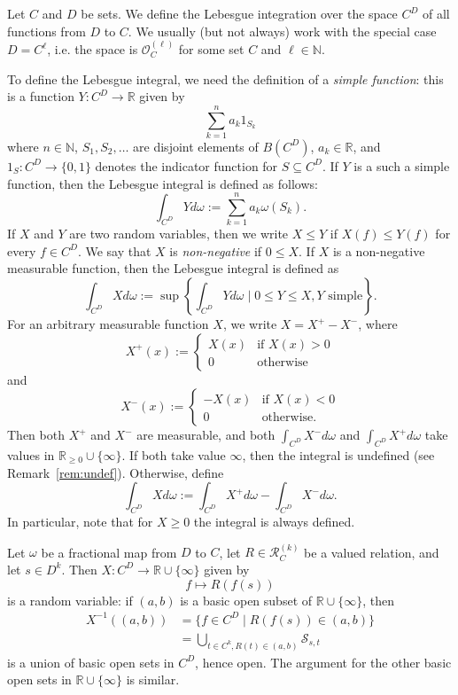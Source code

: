 \documentclass[nonacm]{acmart}
\newcommand{\N}{\mathbb N}
\begin{document}
Let $C$ and $D$ be sets. We define the Lebesgue integration over the space $C^D$ of all functions from $D$ to $C$. We usually (but not always) work with the special case $D = C^{\ell}$, i.e. the space is $\mathscr O_C^{(\ell)}$ for some set $C$ and $\ell\in \N$.

To define the Lebesgue integral, 
we need the definition of a \emph{simple function}:
this is a function $Y \colon C^D \to {\mathbb R}$ given by
$$\sum_{k=1}^n a_k 1_{S_k}$$
where $n \in \N$, $S_1,S_2,\dots$ are disjoint elements of $B(C^D)$, $a_k \in {\mathbb R}$, and $1_S \colon C^D \to \{0,1\}$ denotes the indicator function for $S \subseteq C^D$.
If $Y$ is a such a simple function, 
then the Lebesgue integral is defined as follows:
$$\int_{C^D} Y d \omega := \sum_{k =1}^n a_k \omega(S_k).$$
If $X$ and $Y$ are two random variables, then we write $X \leq Y$ if $X(f) \leq Y(f)$ for every $f \in C^D$. We say that $X$ is \emph{non-negative} if $0 \leq X$. 
If $X$ is a non-negative measurable function, then the Lebesgue integral is defined as 
$$\int_{C^D} X d \omega := \sup \left\{ \int_{C^D} Y d \omega \mid 0 \leq Y \leq X, Y \text{ simple} \right\}.$$
For an arbitrary measurable function $X$, we write $X = X^+ - X^-$, 
where $$X^+(x) := \begin{cases} X(x) & \text{if } X(x) > 0 \\
0 & \text{otherwise} \end{cases}$$
and 
$$X^-(x) := \begin{cases} -X(x) & \text{if } X(x) < 0 \\
0 & \text{otherwise.} \end{cases}$$
Then both $X^+$ and $X^-$ are measurable, and both 
$\int_{C^D} X^- d \omega$ 
and 
$\int_{C^D} X^+ d \omega$ take values in ${\mathbb R}_{\geq 0} \cup \{\infty\}$. 
If both take value $\infty$, then the integral is undefined (see Remark~\ref{rem:undef}). 
Otherwise, define 
$$\int_{C^D} X d \omega := \int_{C^D} X^+ d \omega - \int_{C^D} X^- d \omega.$$
In particular, note that for $X \geq 0$ the integral is always defined.

Let $\omega$ be a fractional map from $D$ to $C$, let $R \in {\mathscr R}^{(k)}_{C}$ be a valued relation, and let $s \in D^k$. Then $X \colon C^D \rightarrow {\mathbb R} \cup \{\infty\}$ given by 
$$ f \mapsto R(f(s))$$
is a random variable: 
if $(a,b)$ is a basic open subset of ${\mathbb R} \cup \{\infty\}$, then
\begin{align*}
    X^{-1}((a,b)) 
    & = \{f \in C^D \mid R(f(s)) \in (a,b) \} \\
    & = \bigcup_{t \in C^k,R(t) \in (a,b)}{\mathscr S}_{s,t}
\end{align*}
is a union of basic open sets in $C^D$, hence open. The argument for the other basic open sets in ${\mathbb R} \cup \{\infty\}$ is similar. 
\end{document}
